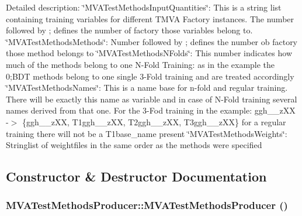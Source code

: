 Detailed description: \char`\"{}MVATestMethodsInputQuantities\char`\"{}: This is a string list containing training variables for different TMVA Factory instances. The number followed by ; defines the number of factory those variables belong to. \char`\"{}MVATestMethodsMethods\char`\"{}: Number followed by ; defines the number ob factory those method belongs to \char`\"{}MVATestMethodsNFolds\char`\"{}: This number indicates how much of the methods belong to one N-\/Fold Training: as in the example the 0;BDT methods belong to one single 3-\/Fold training and are treated accordingly \char`\"{}MVATestMethodsNames\char`\"{}: This is a name base for n-\/fold and regular training. There will be exactly this name as variable and in case of N-\/Fold training several names derived from that one. For the 3-\/Fod training in the example: ggh\_\_\-zXX -\/$>$ \{ggh\_\_\-zXX, T1ggh\_\_\-zXX, T2ggh\_\_\-zXX, T3ggh\_\_\-zXX\} for a regular training there will not be a T1base\_\-name present \char`\"{}MVATestMethodsWeights\char`\"{}: Stringlist of weightfiles in the same order as the methods were specified 

\subsection{Constructor \& Destructor Documentation}
\hypertarget{classMVATestMethodsProducer_a8068f80a6a967eb30f9f00e911f6d55a}{
\subsubsection[{MVATestMethodsProducer}]{\setlength{\rightskip}{0pt plus 5cm}MVATestMethodsProducer::MVATestMethodsProducer ()}}
\label{classMVATestMethodsProducer_a8068f80a6a967eb30f9f00e911f6d55a}


